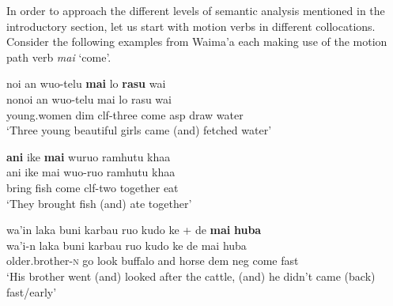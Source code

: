 In order to approach the different levels of semantic analysis mentioned in the introductory section, let us start with motion verbs in different collocations. Consider the following examples from Waima'a each making use of the motion path verb \textit{mai} `come'. 

\pex \label{WMH_Julio_goat099}
\ea
\gll noi an wuo-telu \textbf{mai} lo \textbf{rasu} wai \\
nonoi an wuo-telu mai lo rasu wai \\
\glc young.women \acs{dim} \acs{clf}-three come \acs{asp} draw water\\
\glft `Three young beautiful girls came (and) fetched water' \ 
\z
\xe

\pex \label{WMH_Julio_goat049}
\ea
\gll \textbf{ani} ike \textbf{mai} wuruo ramhutu khaa \\
ani ike mai wuo-ruo ramhutu khaa \\
\glc bring fish come \acs{clf}-two together eat\\
\glft `They brought fish (and) ate together' \ 
\z
\xe

\pex \label{WMH_Julio_goat057}
\ea%
\gll wa'in laka buni karbau ruo kudo ke + de \textbf{mai} \textbf{huba} \\
wa'i-n laka buni karbau ruo kudo ke de mai huba \\
\glc older.brother-\textsc{n} go look buffalo and horse \acs{dem} \acs{neg} come fast\\
\glft `His brother went (and) looked after the cattle, (and) he didn't came (back) fast/early' \ 
\z
\xe

